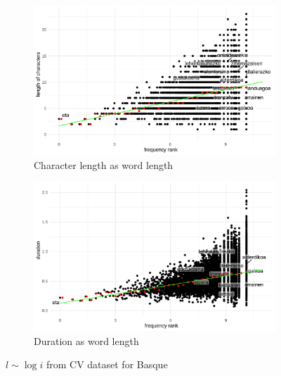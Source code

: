 \begin{figure}[H]
  \centering
  \begin{subfigure}[b]{0.48\textwidth}
    \centering
    \includegraphics[width=\textwidth]{plots/Basque_logi_cl_CV.pdf}
    \caption{Character length as word length}
  \end{subfigure}
  \hfill
  \begin{subfigure}[b]{0.48\textwidth}
    \centering
    \includegraphics[width=\textwidth]{plots/Basque_logi_d_CV.pdf}
    \caption{Duration as word length}
  \end{subfigure}
  \caption{$l \sim \log i$ from CV dataset for Basque}
\end{figure}
